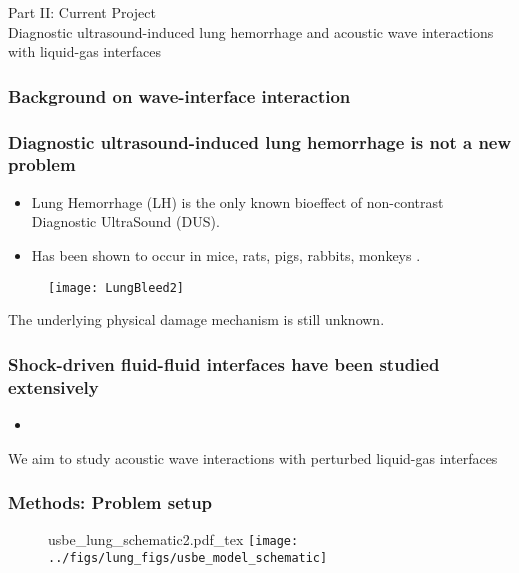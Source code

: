\begin{frame}
  \centering
  \begin{center}
    {\LARGE Part II: Current Project}\\
    
    Diagnostic ultrasound-induced lung hemorrhage and acoustic wave
    interactions with liquid-gas interfaces
  \end{center}
\end{frame}
\begin{frame} \frametitle{Background on wave-interface interaction}

\end{frame}
\begin{frame} \frametitle{Diagnostic ultrasound-induced lung hemorrhage is not a new problem}
{\small
  \begin{itemize}
  \item Lung Hemorrhage (LH) is the only known bioeffect of non-contrast Diagnostic UltraSound (DUS).
  \item Has been shown to occur in mice, rats, pigs, rabbits, monkeys \citep{Child1990,OBrien1997a,OBrien2001,Tarantal1994a}.
  \end{itemize}
}
\vspace{-0.5cm}
  \begin{figure}
    \centering
    \texttt{[image: LungBleed2]} \nocite{Miller2012}
  \end{figure}
\vspace{-0.35cm}
The underlying physical damage mechanism is still unknown.
%
\end{frame}
\begin{frame} \frametitle{Shock-driven fluid-fluid interfaces have been studied extensively}
  \begin{itemize}
  \item 
  \end{itemize}
\end{frame}
\begin{frame}
We aim to study acoustic wave interactions with perturbed liquid-gas interfaces
\end{frame}
\begin{frame} \frametitle{Methods: Problem setup}
  \begin{figure}
    \centering
    \def\svgwidth{0.48\textwidth}
    {\footnotesize
    {usbe_lung_schematic2.pdf_tex} \hfill%
  }
    \texttt{[image: ../figs/lung\_figs/usbe\_model\_schematic]} \hfill
  \end{figure}
\end{frame}
